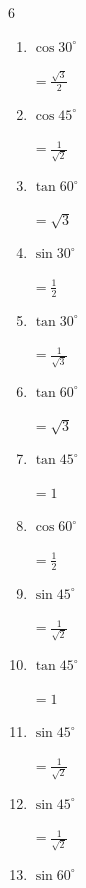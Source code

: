 \begin{multicols}{6}
\begin{enumerate}
        $\displaystyle =\frac{1}{\sqrt{3}}$

  \item $\displaystyle \cos{30^\circ}$

        $\displaystyle =\frac{\sqrt{3}}{2}$

  \item $\displaystyle \cos{45^\circ}$

        $\displaystyle =\frac{1}{\sqrt{2}}$

\columnbreak %

  \item $\displaystyle \tan{60^\circ}$

        $\displaystyle =\sqrt{3}$

  \item $\displaystyle \sin{30^\circ}$

        $\displaystyle =\frac{1}{2}$

  \item $\displaystyle \tan{30^\circ}$

        $\displaystyle =\frac{1}{\sqrt{3}}$

  \item $\displaystyle \tan{60^\circ}$

        $\displaystyle =\sqrt{3}$

  \item $\displaystyle \tan{45^\circ}$

        $\displaystyle =1$

  \item $\displaystyle \cos{60^\circ}$

        $\displaystyle =\frac{1}{2}$

  \item $\displaystyle \sin{45^\circ}$

        $\displaystyle =\frac{1}{\sqrt{2}}$

  \item $\displaystyle \tan{45^\circ}$

        $\displaystyle =1$

  \item $\displaystyle \sin{45^\circ}$

        $\displaystyle =\frac{1}{\sqrt{2}}$

  \item $\displaystyle \sin{45^\circ}$

        $\displaystyle =\frac{1}{\sqrt{2}}$

  \item $\displaystyle \sin{60^\circ}$


\end{enumerate}
\end{multicols}
